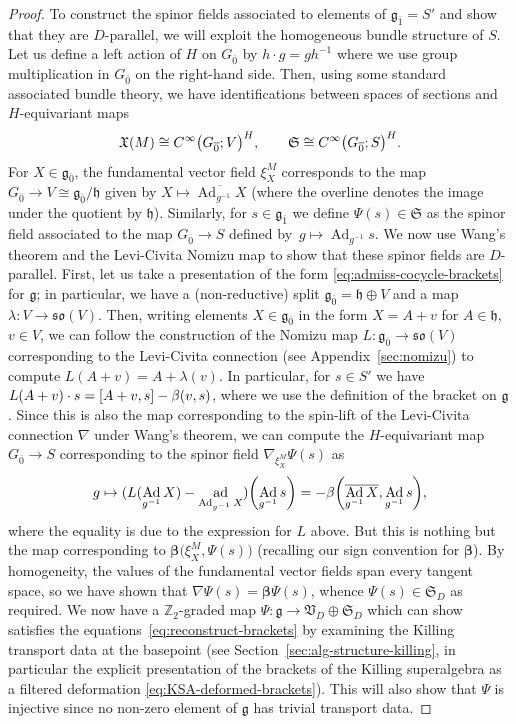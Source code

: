 \documentclass[11pt]{article}
\numberwithin{equation}{section}
\numberwithin{equation}{section}
\newcommand{\fg}{\mathfrak{g}}
\newcommand{\fh}{\mathfrak{h}}
\newcommand{\fso}{\mathfrak{so}}
\newcommand{\fX}{\mathfrak{X}}
\newcommand{\fS}{\mathfrak{S}}
\newcommand{\fV}{\mathfrak{V}}
\newcommand{\ZZ}{\mathbb{Z}}
\newcommand{\1}{\mathbbm{1}}
\DeclareMathOperator{\Ad}{Ad}
\DeclareMathOperator{\ad}{ad}
\begin{document}
\begin{proof}
	To construct the spinor fields associated to elements of $\fg_{\overline 1}=S'$ and show that they are $D$-parallel, we will exploit the homogeneous bundle structure of $S$. Let us define a left action of $H$ on $G_{\overline 0}$ by $h\cdot g=gh^{-1}$ where we use group multiplication in $G_{\overline 0}$ on the right-hand side. Then, using some standard associated bundle theory, we have identifications between spaces of sections and $H$-equivariant maps
	\[
		\fX(M) \cong C^\infty\qty(G_{\overline 0};V)^H,\qquad
		\fS \cong C^\infty\qty(G_{\overline 0};S)^H.
	\]
	For $X\in\fg_{\overline 0}$, the fundamental vector field $\xi^M_X$ corresponds to the map $G_{\overline 0}\to V\cong\fg_{\overline 0}/\fh$ given by $X\mapsto \overline{\Ad_{g^{-1}}X}$ (where the overline denotes the image under the quotient by $\fh$). Similarly, for $s\in \fg_{\overline 1}$ we define $\Psi(s)\in\fS$ as the spinor field associated to the map $G_{\overline 0}\to S$ defined by~${g\mapsto \Ad_{g^{-1}}s}$. We now use Wang's theorem and the Levi-Civita Nomizu map to show that these spinor fields are $D$-parallel. First, let us take a presentation of the form \eqref{eq:admiss-cocycle-brackets} for $\fg$; in particular, we have a (non-reductive) split $\fg_{\overline0}=\fh\oplus V$ and a map $\lambda\colon V\to\fso(V)$. Then, writing elements $X\in\fg_{\overline 0}$ in the form $X=A+v$ for $A\in\fh$, $v\in V$, we can follow the construction of the Nomizu map $L\colon \fg_{\overline 0}\to\fso(V)$ corresponding to the Levi-Civita connection (see Appendix~\ref{sec:nomizu}) to compute
$L(A+v) = A + \lambda(v)$.
	In particular, for $s\in S'$ we have $L(A+v)\cdot s = \comm{A+v}{s} - \beta(v,s)$, where we use the definition of the bracket on $\fg$. Since this is also the map corresponding to the spin-lift of the Levi-Civita connection $\nabla$ under Wang's theorem, we can compute the $H$-equivariant map $G_{\overline 0}\to S$ corresponding to the spinor field $\nabla_{\xi^M_X}\Psi(s)$ as
	\[
		g \mapsto (L(\Ad_{g^{-1}}X) - \ad_{\Ad_{g^{-1}}X})\qty(\Ad_{g^{-1}}s) = - \beta\qty(\overline{\Ad_{g^{-1}}X},\Ad_{g^{-1}}s),
	\]
	where the equality is due to the expression for $L$ above. But this is nothing but the map corresponding to $\boldsymbol{\beta}\bigl(\xi^M_X,\Psi(s)\bigr)$ (recalling our sign convention for $\boldsymbol{\beta}$). By homogeneity, the values of the fundamental vector fields span every tangent space, so we have shown that $\nabla\Psi(s)=\boldsymbol{\beta}\Psi(s)$, whence $\Psi(s)\in\fS_D$ as required. We now have a $\ZZ_2$-graded map $\Psi\colon\fg\to\fV_D\oplus\fS_D$ which can show satisfies the equations~\eqref{eq:reconstruct-brackets} by examining the Killing transport data at the basepoint (see Section~\ref{sec:alg-structure-killing}, in particular the explicit presentation of the brackets of the Killing superalgebra as a filtered deformation \eqref{eq:KSA-deformed-brackets}). This will also show that $\Psi$ is injective since no non-zero element of $\fg$ has trivial transport data.
	

\end{proof}
\end{document}
